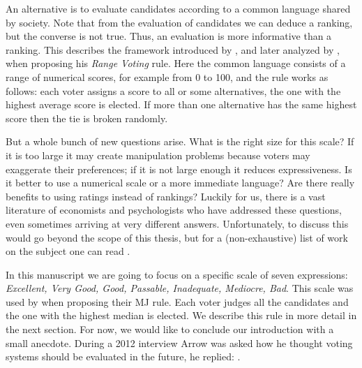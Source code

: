 An alternative is to evaluate candidates according to a common language shared by society. Note that from the evaluation of candidates we can deduce a ranking, but the converse is not true. Thus, an evaluation is more informative than a ranking.
This describes the framework introduced by \citet{Smith2000}, and later analyzed by \citet{Pivato2014,Gaertner2012,Zahid2015}, when proposing his \textit{Range Voting} rule.
Here the common language consists of a range of numerical scores, for example from 0 to 100, and the rule works as follows: each voter assigns a score to all or some alternatives, the one with the highest average score is elected. If more than one alternative has the same highest score then the tie is broken randomly.

But a whole bunch of new questions arise. What is the right size for this scale? If it is too large it may create manipulation problems because voters may exaggerate their preferences; if it is not large enough it reduces expressiveness. Is it better to use a numerical scale or a more immediate language? Are there really benefits to using ratings instead of rankings? 
Luckily for us, there is a vast literature of economists and psychologists who have addressed these questions, even sometimes arriving at very different answers. Unfortunately, to discuss this would go beyond the scope of this thesis, but for a (non-exhaustive) list of work on the subject one can read \citet{Cox1980,Sparling2011,Churchill1984,Preston2000,Maio1996}.

In this manuscript we are going to focus on a specific scale of seven expressions: \textit{Excellent, Very Good, Good, Passable, Inadequate, Mediocre, Bad}. This scale was used by \citet{Balinski2007} when proposing their \ac{MJ} rule. Each voter judges all the candidates and the one with the highest median is elected. We describe this rule in more detail in the next section.
For now, we would like to conclude our introduction with a small anecdote. During a 2012 interview Arrow was asked how he thought voting systems should be evaluated in the future, he replied:  \citep{PodcastArrow}.

